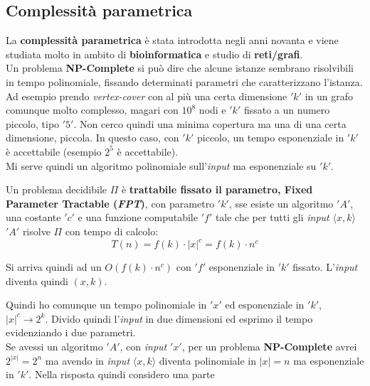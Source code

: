 				\subsection{Complessità parametrica}
										La \textbf{complessità parametrica} è stata introdotta negli anni novanta e
										viene studiata molto in ambito di \textbf{bioinformatica} e studio di
										\textbf{reti/grafi}.\\
										Un problema \textbf{NP-Complete} si può dire che alcune istanze sembrano
										risolvibili in tempo polinomiale, fissando determinati parametri che
										caratterizzano l'istanza. Ad esempio prendo \textit{vertex-cover} con al più una
										certa dimensione $ 'k' $ in un grafo comunque molto complesso, magari con $10^8$
										nodi e $ 'k' $ fissato a un numero piccolo, tipo $ '5' $. Non cerco quindi una minima
										copertura ma una di una certa dimensione, piccola. In questo caso, con $ 'k' $
										piccolo, un tempo esponenziale in $ 'k' $ è accettabile (esempio $2^5$ è
										accettabile).\\
										Mi serve quindi un algoritmo polinomiale sull'\textit{input} ma esponenziale su $ 'k' $.
										\begin{definizione}
											Un problema decidibile $\Pi$ è \textbf{trattabile fissato il parametro, Fixed
												Parameter Tractable (\textit{FPT})}, con parametro $ 'k' $, sse esiste un
											algoritmo $ 'A' $, una costante $ 'c' $ e una funzione computabile $ 'f' $ tale che per
											tutti gli \textit{input} $\langle x,k\rangle$ $ 'A' $ risolve $\Pi$ con tempo di calcolo:
											\[T(n) = f(k)\cdot|x|^c=f(k)\cdot n^c\]
											\begin{nota}
												Si arriva quindi ad un $O(f(k)\cdot n^c)$ con $ 'f' $ esponenziale in $ 'k' $
												fissato. L'\textit{input} diventa quindi $(x,k)$.
											\end{nota}
										\end{definizione}
										Quindi ho comunque un tempo polinomiale in $ 'x' $ ed esponenziale in $ 'k' $, $|x|^c\to
										2^k$. Divido quindi l'\textit{input} in due dimensioni ed esprimo il tempo evidenziando
										i due parametri.\\
										Se avessi un algoritmo $ 'A' $, con \textit{input} $ 'x' $, per un problema \textbf{NP-Complete}
										avrei $2^{|x|}=2^n$ ma avendo in \textit{input} $\langle x,k\rangle$ diventa polinomiale
										in $|x|=n$ ma esponenziale in $ 'k' $. Nella risposta quindi considero una parte
